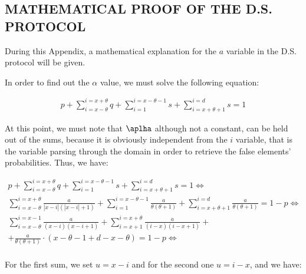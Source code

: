 \documentclass[inscr]{dithesis}
\begin{document}
\begin{appendix}
\appendixstartedtrue

{}

\chapter{MATHEMATICAL PROOF OF THE D.S. PROTOCOL}
During this Appendix, a mathematical explanation for the $a$ variable in the D.S. protocol will be given.

In order to find out the $\alpha$ value, we must solve the following equation:

\begin{align*}
    p + \sum_{i = x - \theta}^{i = x + \theta} q + \sum_{i = 1}^{i = x - \theta -1} s + \sum_{i = x + \theta + 1}^{i = d} s = 1
\end{align*}

At this point, we must note that $\aplha$ although not a constant, can be held out of the sums, because it is obviously independent from the $i$ variable, that is the variable parsing through the domain in order to retrieve the false elements' probabilities. Thus, we have:

\begin{align*}
        p + \sum_{i = x - \theta}^{i = x + \theta} q + \sum_{i = 1}^{i = x - \theta -1} s + \sum_{i = x + \theta + 1}^{i = d} s = 1 \Longleftrightarrow \\
      \sum_{i = x - \theta}^{i = x + \theta} \frac{a}{|x-i|(|x-i| + 1)} + \sum_{i = 1}^{i = x - \theta -1} \frac{a}{\theta(\theta+1)} + \sum_{i = x + \theta + 1}^{i = d} \frac{a}{\theta(\theta+1)} = 1 - p \Longleftrightarrow \\
    \sum_{i = x - \theta}^{i = x - 1} \frac{a}{(x - i)(x - i + 1)} + \sum_{i = x + 1}^{i = x + \theta} \frac{a}{(i - x)(i - x + 1)} +\\+ \frac{a}{\theta(\theta+1)} \cdot (x - \theta - 1 + d - x - \theta) = 1 - p \Longleftrightarrow \\
\end{align*}

For the first sum, we set $u = x - i$ and for the second one $u = i - x$, and we have:


\end{appendix}
\end{document}
